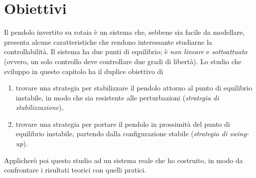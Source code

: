 \section{Obiettivi}
Il pendolo invertito su rotaia è un sistema che,
sebbene sia facile da modellare, presenta alcune
caratteristiche che rendono interessante studiarne la
controllabilità.
Il sistema ha due punti di equilibrio; è
\emph{non lineare} e \emph{sottoattuato} (ovvero, un solo controllo
deve controllare due gradi di libertà).
Lo studio che sviluppo in questo capitolo ha il duplice obiettivo di
\begin{enumerate}
    \item trovare una strategia per stabilizzare il pendolo attorno al punto di equilibrio instabile, in modo che sia resistente alle perturbazioni (\emph{strategia di stabilizzazione}),
    \item trovare una strategia per portare il pendolo in prossimità del punto di equilibrio instabile, partendo dalla configurazione stabile (\emph{strategia di swing-up}).
\end{enumerate}
Applicherò poi questo studio ad un sistema reale che ho costruito, 
in modo da confrontare i risultati teorici con quelli pratici.